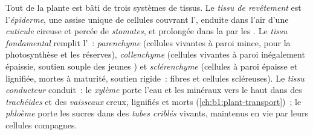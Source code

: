 \begin{definition}\label{def:b1:flowering-plant-organization:tissues}
Tout  de la plante est bâti de trois systèmes de tissus. Le
\emph{tissu de revêtement} est
l'\emph{épiderme}, une assise unique de cellules
couvrant l', enduite dans l'air d'une \emph{cuticule}
cireuse et percée de \emph{stomates}, et prolongée dans
la  par les . Le \emph{tissu
fondamental} remplit l'~:
\emph{parenchyme} (cellules vivantes à paroi mince,
pour la photosynthèse et les réserves),
\emph{collenchyme} (cellules vivantes à paroi
inégalement épaissie, soutien souple des jeunes ) et
\emph{sclérenchyme} (cellules à paroi épaisse et
lignifiée, mortes à maturité, soutien rigide~: fibres et cellules
scléreuses). Le \emph{tissu conducteur} conduit~:
le \emph{xylème} porte l'eau et les minéraux vers le haut
dans des \emph{trachéides} et des
\emph{vaisseaux} creux, lignifiés et morts
(\cref{ch:b1:plant-transport})~; le \emph{phloème} porte
les sucres dans des \emph{tubes criblés} vivants,
maintenus en vie par leurs cellules compagnes.
\end{definition}

